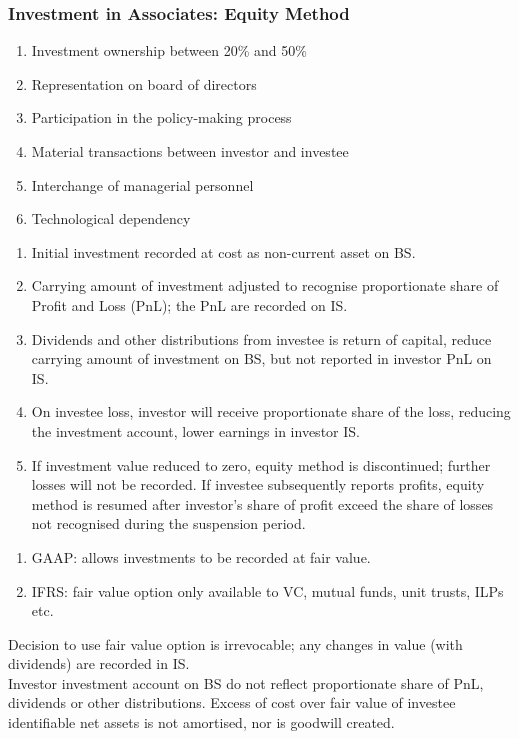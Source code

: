 \subsubsection{Investment in Associates: Equity Method}

\begin{remark} 
\begin{enumerate}[label=\roman*.]
\setlength{\itemsep}{0pt}
\item Investment ownership between 20\% and 50\%
\item Representation on board of directors
\item Participation in the policy-making process
\item Material transactions between investor and investee
\item Interchange of managerial personnel
\item Technological dependency
\end{enumerate}
\end{remark}

\begin{method} 
\begin{enumerate}[label=\roman*.]
\setlength{\itemsep}{0pt}
\item Initial investment recorded at cost as non-current asset on BS.
\item Carrying amount of investment adjusted to recognise proportionate share of Profit and Loss (PnL); the PnL are recorded on IS.
\item Dividends and other distributions from investee is return of capital, reduce carrying amount of investment on BS, but not reported in investor PnL on IS.
\item On investee loss, investor will receive proportionate share of the loss, reducing the investment account, lower earnings in investor IS.
\item If investment value reduced to zero, equity method is discontinued; further losses will not be recorded. If investee subsequently reports profits, equity method is resumed after investor’s share of profit exceed the share of losses not recognised during the suspension period.
\end{enumerate}
\end{method}

\begin{remark} 
\begin{enumerate}[label=\roman*.]
\setlength{\itemsep}{0pt}
\item GAAP: allows investments to be recorded at fair value.
\item IFRS: fair value option only available to VC, mutual funds, unit trusts, ILPs etc. 
\end{enumerate}
Decision to use fair value option is irrevocable; any changes in value (with dividends) are recorded in IS.\\
Investor investment account on BS do not reflect proportionate share of PnL, dividends or other distributions. Excess of cost over fair value of investee identifiable net assets is not amortised, nor is goodwill created.
\end{remark}

